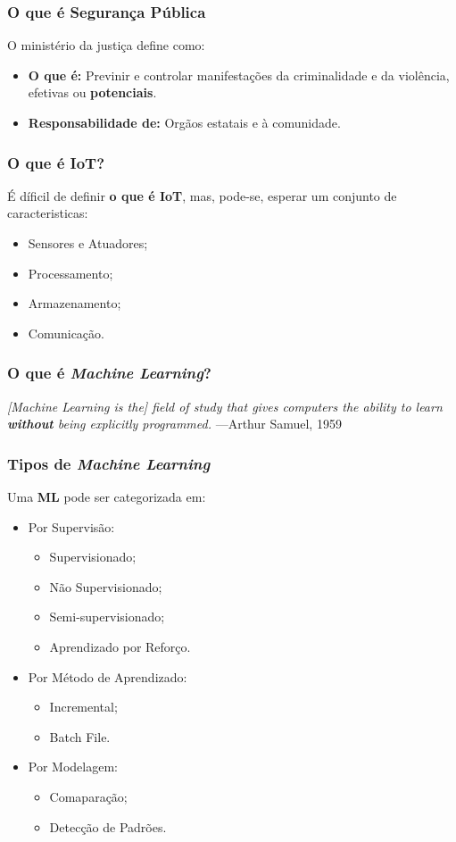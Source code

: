 \begin{frame}
	\frametitle{O que é Segurança Pública}
	O ministério da justiça\cite{seguranca-publica} define como:
	\begin{itemize}
		\item \textbf{O que é:}
		Previnir e controlar manifestações da criminalidade
		e da violência, efetivas ou \textbf{potenciais}.
		\item \textbf{Responsabilidade de:}
		Orgãos estatais e à comunidade.
	\end{itemize}
\end{frame}

\begin{frame}
	\frametitle{O que é IoT?}

	É díficil de definir \textbf{o que é IoT}, mas,	pode-se, 
	esperar um conjunto de caracteristicas\cite{iot-definition}:
	\begin{itemize}
	\item Sensores e Atuadores;
	\item Processamento;
	\item Armazenamento;
	\item Comunicação.
	\end{itemize}
\end{frame}

\begin{frame}
	\frametitle{O que é \textit{Machine Learning}?}
	\textit{[Machine  Learning  is  the]  field  of  study  that  gives  computers  the  ability  to  learn
	\textbf{without} being explicitly programmed.}
	—Arthur Samuel, 1959
\end{frame}

\begin{frame}
	\frametitle{Tipos de \textit{Machine Learning}}
	Uma \textbf{ML} pode ser categorizada\cite{machine-learning} em:
	\begin{itemize}[<+->]
		\item Por Supervisão:
			\begin{itemize}[<+->]
				\item Supervisionado;
				\item Não Supervisionado;
				\item Semi-supervisionado;
				\item Aprendizado por Reforço.
			\end{itemize}	
		\item Por Método de Aprendizado:
			\begin{itemize}[<+->]
				\item Incremental;
				\item Batch File.
			\end{itemize}
		\item Por Modelagem:
		\begin{itemize}[<+->]
			\item Comaparação;
			\item Detecção de Padrões.
		\end{itemize}
	\end{itemize}	
\end{frame}